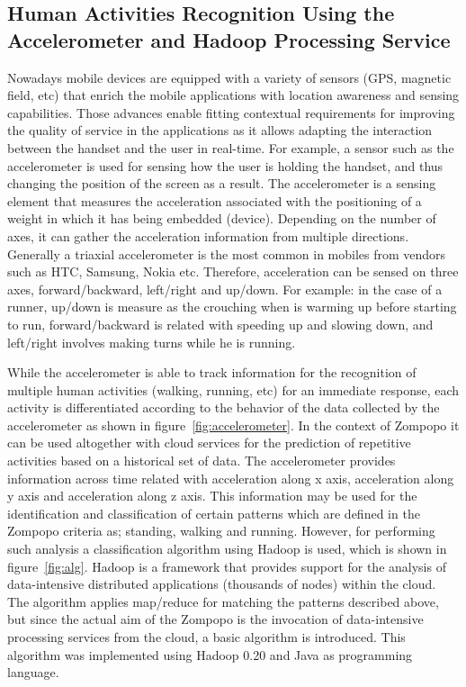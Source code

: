 \subsection{Human Activities Recognition Using the Accelerometer and Hadoop Processing Service}
Nowadays mobile devices are equipped with a variety of sensors (GPS, magnetic field, etc) that enrich the mobile applications with location awareness and sensing capabilities. Those advances enable fitting contextual requirements for improving the quality of service in the applications as it allows adapting the interaction between the handset and the user in real-time. For example, a sensor such as the accelerometer is used for sensing how the user is holding the handset, and thus changing the position of the screen as a result. The accelerometer is a sensing element that measures the acceleration associated with the positioning of a weight in which it has being embedded (device). Depending on the number of axes, it can gather the acceleration information from multiple directions. Generally a triaxial accelerometer is the most common in mobiles from vendors such as HTC, Samsung, Nokia etc. Therefore, acceleration can be sensed on three axes, forward/backward, left/right and up/down. For example: in the case of a runner, up/down is measure as the crouching when is warming up before starting to run, forward/backward is related with speeding up and slowing down,  and left/right involves making turns while he is running.

While the accelerometer is able to track information for the recognition of multiple human activities (walking, running, etc) for an immediate response, each activity is differentiated according to the behavior of the data collected by the accelerometer as shown in figure~\ref{fig:accelerometer}. In the context of Zompopo it can be used altogether with cloud services for the prediction of repetitive activities based on a historical set of data. The accelerometer provides information across time related with acceleration along x axis, acceleration along y axis and acceleration along z axis. This information may be used for the identification and classification of certain patterns which are defined in the Zompopo criteria as; standing, walking and running. However, for performing such analysis a classification algorithm using Hadoop is used, which is shown in figure~\ref{fig:alg}. Hadoop is a framework that provides support for the analysis of data-intensive distributed applications (thousands of nodes) within the cloud. The algorithm applies map/reduce for matching the patterns described above, but since the actual aim of the Zompopo is the invocation of  data-intensive processing services from the cloud, a basic algorithm is introduced. This algorithm was implemented using Hadoop 0.20 and Java as programming language.

